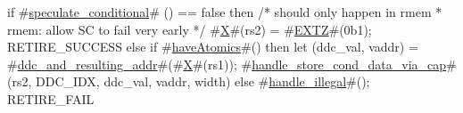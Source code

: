 if #\hyperref[sailRISCVzspeculatezyconditional]{speculate\_conditional}# () == false then {
  /* should only happen in rmem
   * rmem: allow SC to fail very early
   */
  #\hyperref[sailRISCVzX]{X}#(rs2) = #\hyperref[sailRISCVzEXTZ]{EXTZ}#(0b1);
  RETIRE_SUCCESS
} else if #\hyperref[sailRISCVzhaveAtomics]{haveAtomics}#() then {
  let (ddc_val, vaddr) = #\hyperref[sailRISCVzddczyandzyresultingzyaddr]{ddc\_and\_resulting\_addr}#(#\hyperref[sailRISCVzX]{X}#(rs1));
  #\hyperref[sailRISCVzhandlezystorezycondzydatazyviazycap]{handle\_store\_cond\_data\_via\_cap}#(rs2, DDC_IDX, ddc_val, vaddr, width)
} else {
  #\hyperref[sailRISCVzhandlezyillegal]{handle\_illegal}#();
  RETIRE_FAIL
}
